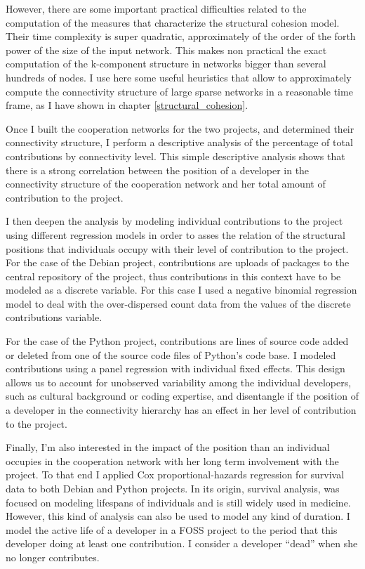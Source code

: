 However, there are some important practical difficulties related to the computation of the measures that characterize the structural cohesion model. Their time complexity is super quadratic, approximately of the order of the forth power of the size of the input network. This makes non practical the exact computation of the k-component structure in networks bigger than several hundreds of nodes. I use here some useful heuristics that allow to approximately compute the connectivity structure of large sparse networks in a reasonable time frame, as I have shown in chapter \ref{structural_cohesion}.

Once I built the cooperation networks for the two projects, and determined their connectivity structure, I perform a descriptive analysis of the percentage of total contributions by connectivity level. This simple descriptive analysis shows that there is a strong correlation between the position of a developer in the connectivity structure of the cooperation network and her total amount of contribution to the project.

I then deepen the analysis by modeling individual contributions to the project using different regression models in order to asses the relation of the structural positions that individuals occupy with their level of contribution to the project. For the case of the Debian project, contributions are uploads of packages to the central repository of the project, thus contributions in this context have to be modeled as a discrete variable. For this case I used a negative binomial regression model to deal with the over-dispersed count data from the values of the discrete contributions variable.

For the case of the Python project, contributions are lines of source code added or deleted from one of the source code files of Python's code base. I modeled contributions using a panel regression with individual fixed effects. This design allows us to account for unobserved variability among the individual developers, such as cultural background or coding expertise, and disentangle if the position of a developer in the connectivity hierarchy has an effect in her level of contribution to the project.

Finally, I'm also interested in the impact of the position than an individual occupies in the cooperation network with her long term involvement with the project. To that end I applied Cox proportional-hazards regression for survival data to both Debian and Python projects. In its origin, survival analysis, was focused on modeling lifespans of individuals and is still widely used in medicine. However, this kind of analysis can also be used to model any kind of duration. I model the active life of a developer in a FOSS project to the period that this developer doing at least one contribution. I consider a developer ``dead'' when she no longer contributes.

